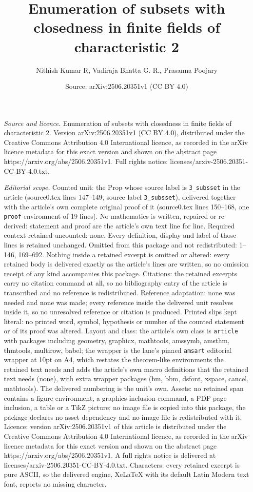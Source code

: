 \documentclass[10pt,a4paper]{amsart}
\title[Enumeration of subsets with closedness in finite fields of c]{Enumeration of subsets with closedness in finite fields of characteristic 2}
\author{Nithish Kumar R, Vadiraja Bhatta G. R., Prasanna Poojary}
\date{Source: arXiv:2506.20351v1 (CC BY 4.0)}
\begin{document}
\maketitle

\noindent\emph{Source and licence.} Enumeration of subsets with closedness in finite fields of characteristic 2. Version arXiv:2506.20351v1 (CC BY 4.0), distributed under the Creative Commons Attribution 4.0 International licence, as recorded in the arXiv licence metadata for this exact version and shown on the abstract page https://arxiv.org/abs/2506.20351v1. Full rights notice: licenses/arxiv-2506.20351-CC-BY-4.0.txt.\par\smallskip

\noindent\textit{Editorial scope.} Counted unit: the Prop whose source label is \texttt{3\_subsset} in the article (source0.tex lines 147--149, source label \texttt{3\_subsset}), delivered together with the article's own complete original proof of it (source0.tex lines 150--168, one \texttt{proof} environment of 19 lines). No mathematics is written, repaired or re-derived: statement and proof are the article's own text line for line. Required context retained uncounted: none. Every definition, display and label of those lines is retained unchanged. Omitted from this package and not redistributed: 1--146, 169--692. Nothing inside a retained excerpt is omitted or altered: every retained body is delivered exactly as the article's lines are written, so no omission receipt of any kind accompanies this package. Citations: the retained excerpts carry no citation command at all, so no bibliography entry of the article is transcribed and no reference is redistributed. Reference adaptation: none was needed and none was made; every reference inside the delivered unit resolves inside it, so no unresolved reference or citation is produced. Printed slips kept literal: no printed word, symbol, hypothesis or number of the counted statement or of its proof was altered. Layout and class: the article's own class is \texttt{article} with packages including geometry, graphicx, mathtools, amssymb, amsthm, thmtools, multirow, babel; the wrapper is the lane's pinned \texttt{amsart} editorial wrapper at 10pt on A4, which restates the theorem-like environments the retained text needs and adds the article's own macro definitions that the retained text needs (none), with extra wrapper packages (bm, bbm, dsfont, xspace, cancel, mathtools). The delivered numbering is the unit's own. Assets: no retained span contains a figure environment, a graphics-inclusion command, a PDF-page inclusion, a table or a TikZ picture; no image file is copied into this package, the package declares no asset dependency and no image file is redistributed with it. Licence: version arXiv:2506.20351v1 of this article is distributed under the Creative Commons Attribution 4.0 International licence, as recorded in the arXiv licence metadata for this exact version and shown on the abstract page https://arxiv.org/abs/2506.20351v1. A full rights notice is delivered at licenses/arxiv-2506.20351-CC-BY-4.0.txt. Characters: every retained excerpt is pure ASCII, so the delivered engine, XeLaTeX with its default Latin Modern text font, reports no missing character.
\end{document}
